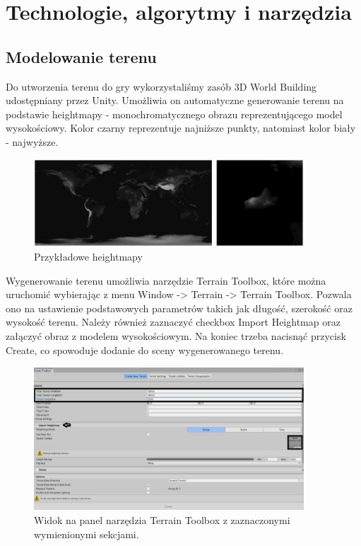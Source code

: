 \chapter{Technologie, algorytmy i narzędzia}\label{chap:algs}


\section{Modelowanie terenu}
Do utworzenia terenu do gry wykorzystaliśmy zasób 3D World Building udostępniany przez Unity. Umożliwia on automatyczne generowanie terenu na podstawie heightmapy - monochromatycznego obrazu reprezentującego model wysokościowy. Kolor czarny reprezentuje najniższe punkty, natomiast kolor biały -  najwyższe.

\begin{figure}[htbp]
    \centering
    \includegraphics[width=0.9\textwidth]{images/modelowanie_terenu/przykladowe_heightmapy.jpg}
    \caption{Przykładowe heightmapy}\label{fig:przykladowe_heightmapy}
\end{figure}

Wygenerowanie terenu umożliwia narzędzie Terrain Toolbox, które można uruchomić wybierając z menu Window -> Terrain -> Terrain Toolbox. Pozwala ono na ustawienie podstawowych parametrów takich jak długość, szerokość oraz wysokość terenu. Należy również zaznaczyć checkbox Import Heightmap oraz załączyć obraz z modelem wysokościowym. Na koniec trzeba nacisnąć przycisk Create, co spowoduje dodanie do sceny wygenerowanego terenu.

\begin{figure}[htbp]
    \centering
    \includegraphics[width=0.9\textwidth]{images/modelowanie_terenu/generowanie.jpg}
    \caption{Widok na panel narzędzia Terrain Toolbox z zaznaczonymi wymienionymi sekcjami.}\label{fig:generowanie_terenu}
\end{figure}

